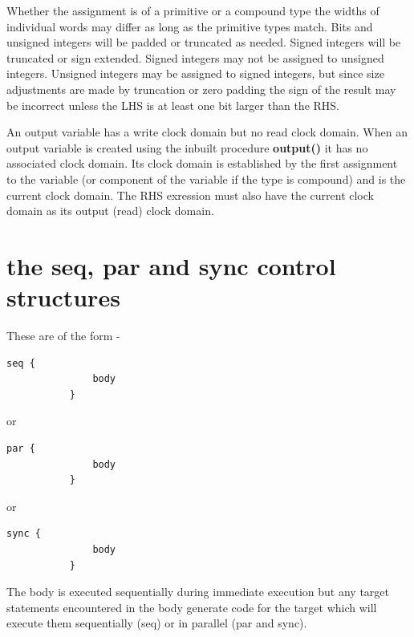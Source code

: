             Whether the assignment is of a primitive or a compound type the widths
            of individual words may differ as long as the primitive types match.
            Bits and unsigned integers will be padded or truncated as needed.
            Signed integers will be truncated or sign extended. Signed integers may
            not be assigned to unsigned integers. Unsigned integers may be assigned
            to signed integers, but since size adjustments are made by truncation
            or zero padding the sign of the result may be incorrect unless the LHS
            is at least one bit larger than the RHS.
        
            An output variable has a write clock domain but no read clock domain.
            When an output variable is created using the inbuilt procedure {\bf
            output()}  it has no associated clock domain. Its
            clock domain is established by the first assignment to the variable (or
            component of the variable if the type is compound) and is the current
            clock domain. The RHS exression must also have the current clock domain
            as its output (read) clock domain.










    \section{the {\bf seq}, {\bf par} and {\bf sync} control structures}\label{sec:seqparsync}

        These are of the form -
        \begin{lstlisting}[gobble=8, language=threepl]
           seq {
               body
           }
        \end{lstlisting}
        or
        \begin{lstlisting}[gobble=8, language=threepl]
           par {
               body
           }
        \end{lstlisting}
        or
        \begin{lstlisting}[gobble=8, language=threepl]
           sync {
               body
           }
        \end{lstlisting}
        The body is executed sequentially during immediate execution but any
        target statements encountered in the body generate code for the
        target which will execute them sequentially (seq) or in parallel (par
        and sync).

